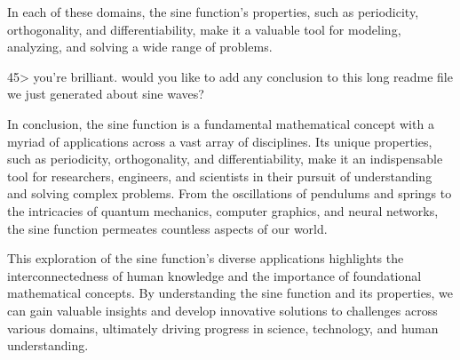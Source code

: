 \documentclass[
]{article}
\begin{document}
In each of these domains, the sine function's properties, such as
periodicity, orthogonality, and differentiability, make it a valuable
tool for modeling, analyzing, and solving a wide range of problems.

45\textgreater{} you're brilliant. would you like to add any conclusion
to this long readme file we just generated about sine waves?

In conclusion, the sine function is a fundamental mathematical concept
with a myriad of applications across a vast array of disciplines. Its
unique properties, such as periodicity, orthogonality, and
differentiability, make it an indispensable tool for researchers,
engineers, and scientists in their pursuit of understanding and solving
complex problems. From the oscillations of pendulums and springs to the
intricacies of quantum mechanics, computer graphics, and neural
networks, the sine function permeates countless aspects of our world.

This exploration of the sine function's diverse applications highlights
the interconnectedness of human knowledge and the importance of
foundational mathematical concepts. By understanding the sine function
and its properties, we can gain valuable insights and develop innovative
solutions to challenges across various domains, ultimately driving
progress in science, technology, and human understanding.
\end{document}

